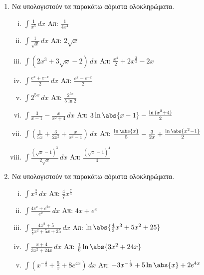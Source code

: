 



\everymath{\displaystyle}



\begin{center}
\end{center}

\vspace{\baselineskip}

\begin{enumerate}
    \item Να υπολογιστούν τα παρακάτω αόριστα ολοκληρώματα.
        \begin{enumerate}[i)]
            \item $ \int \frac{1}{x^{5}} \,{dx} $ \hfill Απ: $ \frac{1}{4x^{4}} $ 
            \item $ \int \frac{1}{\sqrt{x}} \,{dx} $ \hfill Απ: $ 2 \sqrt{x} $
            \item $ \int \left(2x^{3} + 3 \sqrt{x} -2\right) \,{dx} $ 
                \hfill Απ: $ \frac{x^{4}}{2} + 2 x^{\frac{3}{2}} -2x $ 
            \item $ \int \frac{e^{x}+e^{-x}}{2} \,{dx} $ 
                \hfill Απ: $ \frac{e^{x}-e^{-x}}{2} $ 
            \item $ \int 2^{5x} \,{dx} $ \hfill Απ: $ \frac{2^{5x}}{5 \ln{2}} $ 
            \item $ \int \frac{3}{x-1} - \frac{x}{x^{2}+4} \,{dx} $ 
                \hfill Απ:  $ 3 \ln{\abs{x-1}} - \frac{\ln{(x^{2}+4)}}{2} $
            \item $ \int \left(\frac{1}{5x} + \frac{3}{2x^{2}} + 
                \frac{x}{x^{2}-1} \right)  \,{dx} $ 
                \hfill Απ: $ \frac{\ln{\abs{x}}}{5} - \frac{3}{2x} + 
                \frac{\ln{\abs{x^{2}-1}}}{2} $ 
            \item $ \int \frac{(\sqrt{x} -1)^{3}}{2 \sqrt{x}}  \,{dx} $ 
                \hfill Απ: $ \frac{(\sqrt{x} -1)^{4}}{4} $ 
        \end{enumerate}

    \item Να υπολογιστούν τα παρακάτω αόριστα ολοκληρώματα.
        \begin{enumerate}[i)]
            \item $ \int x^{\frac{3}{4}} \,{dx} $ 
                \hfill Απ: $ \frac{4}{7} x^{\frac{7}{4}} $ 
            \item $ \int \frac{4e^{x}+e^{2x}}{e^{x}} \,{dx} $ \hfill Απ: $ 4x + e^{x} $ 
            \item $ \int \frac{4x^{2}+5}{\frac{4}{3} x^{2}+5x+25} \,{dx} $ 
                \hfill Απ: $ \ln{\abs{\frac{4}{3} x^{3} + 5x^{2}+25}} $
            \item $ \int \frac{x+4}{3x^{2}+24 x} \,{dx}  $
                \hfill Απ: $ \frac{1}{6} \ln{\abs{3x^{2}+24x}} $ 
            \item $ \int \left(x^{- \frac{4}{3}} + \frac{5}{x} + 8e^{4x}\right) \,{dx} $
                \hfill Απ: $ -3 x^{-\frac{1}{3}} + 5 \ln{\abs{x}} +2e^{4x} $ 
        \end{enumerate}


\end{enumerate}
